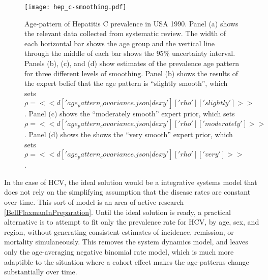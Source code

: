 \begin{figure}
\begin{center}
\texttt{[image: hep\_c-smoothing.pdf]}
\end{center}
\caption{Age-pattern of Hepatitis C prevalence in USA 1990.  Panel (a)
  shows the relevant data collected from systematic review. The width
  of each horizontal bar shows the age group and the vertical line
  through the middle of each bar shows the $95\%$ uncertainty
  interval.  Panels (b), (c), and (d) show estimates of the prevalence
  age pattern for three different levels of smoothing.  Panel (b)
  shows the results of the expert belief that the age pattern is
  ``slightly smooth'', which sets
  $\rho=<<d['age_pattern_covariance.json|dexy']['rho']['slightly']>>$.  Panel (c)
  shows the ``moderately smooth'' expert prior, which sets
  $\rho=<<d['age_pattern_covariance.json|dexy']['rho']['moderately']>>$.  Panel (d)
  shows the shows the ``very smooth'' expert prior, which sets
  $\rho=<<d['age_pattern_covariance.json|dexy']['rho']['very']>>$.}
\label{hep_c-smoothing}
\end{figure}

In the case of HCV, the ideal solution would be a integrative systems
model that does not rely on the simplifying assumption that the
disease rates are constant over time.  This sort of model is an area
of active research \ref{BellFlaxmanInPreparation}.  Until the ideal
solution is ready, a practical alternative is to attempt to fit only
the prevalence rate for HCV, by age, sex, and region, without
generating consistent estimates of incidence, remission, or mortality
simulaneously.  This removes the system dynamics model, and leaves
only the age-averaging negative binomial rate model, which is much
more adaptible to the situation where a cohort effect makes the
age-patterns change substantially over time.

